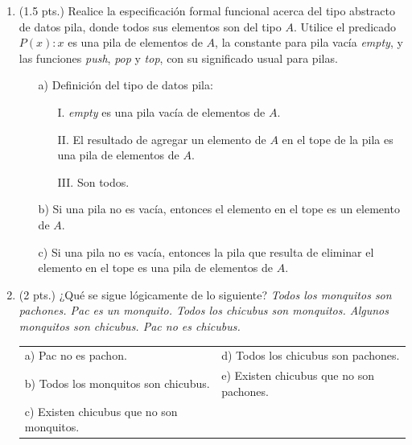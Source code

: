 \documentclass[12pt,letterpaper]{article}
\begin{document}
\begin{enumerate}

\item (1.5 pts.) Realice la especificación formal funcional acerca del tipo abstracto de datos pila, donde todos sus elementos son del tipo $A$. Utilice el predicado $P(x) : x$ es una pila de elementos de $A$, la constante para pila vacía \textit{empty}, y las funciones \textit{push}, \textit{pop} y \textit{top}, con su significado usual para pilas.
  \begin{enumerate}
  \item[a)] Definición del tipo de datos pila:
    \begin{enumerate}
    \item[\footnotesize I.] \textit{empty} es una pila vacía de elementos de $A$.
    \item[\footnotesize II.] El resultado de agregar un elemento de $A$ en el tope de la pila es una pila de elementos de $A$.
    \item[\footnotesize III.] Son todos.
    \end{enumerate}
  \item[b)] Si una pila no es vacía, entonces el elemento en el tope es un elemento de $A$.
  \item[c)] Si una pila no es vacía, entonces la pila que resulta de eliminar el elemento en el tope es una pila de elementos de $A$.
  \end{enumerate}
  \bigskip
  \bigskip
  
\item (2 pts.) ¿Qué se sigue lógicamente de lo siguiente? \textit{Todos los monquitos son pachones. Pac es un monquito. Todos los chicubus son monquitos. Algunos monquitos son chicubus. Pac no es chicubus.}
  
  \vspace{0.2cm}
  
  \begin{center}
    \begin{tabular}{ll}
      a) Pac no es pachon. & d) Todos los chicubus son pachones. \\
      b) Todos los monquitos son chicubus. & e) Existen chicubus que no son pachones. \\
      c) Existen chicubus que no son monquitos. &
    \end{tabular}
  \end{center}
  
  \vspace{0.2cm}
  

\end{enumerate}
\end{document}
